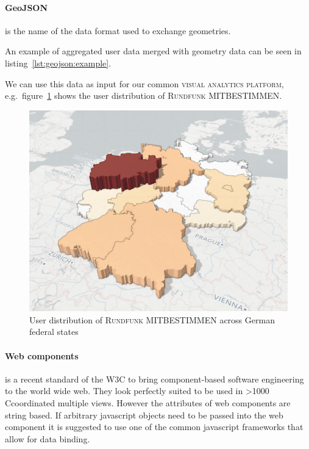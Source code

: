 \documentclass{article}
\newcommand{\rufu}{\textsc{Rundfunk MITBESTIMMEN}}
\newcommand{\visan}{\textsc{visual analytics platform}}
\newcommand\hmm[1]{\ifnum\ifhmode\spacefactor\else2000\fi>1000 \uppercase{#1}\else#1\fi}
\newcommand{\cmvs}{\hmm{c}oordinated multiple views}
\begin{document}
\paragraph{GeoJSON} is the name of the data format used to exchange geometries.

An example of aggregated user data merged with geometry data can be seen in listing~\ref{lst:geojson:example}.


We can use this data as input for our common \visan{}, e.g.\ figure~\ref{fig:implementation:user_distribution} shows the user distribution of \rufu{}.

\begin{figure}[h!]
  \centering
  \includegraphics[width=\textwidth]{images/ua_example.png}
  \caption{%
    User distribution of \rufu{} across German federal states
  }\label{fig:implementation:user_distribution}
\end{figure}

\paragraph{Web components} is a recent standard of the W3C\cite{W3C2017} to bring component-based software engineering to the world wide web.
They look perfectly suited to be used in \cmvs{}.
However the attributes of web components are string based.
If arbitrary javascript objects need to be passed into the web component it is suggested to use one of the common javascript frameworks that allow for data binding.
\end{document}

